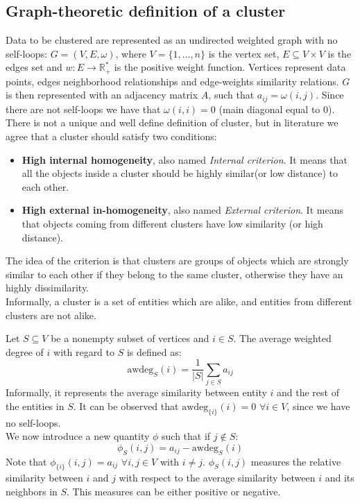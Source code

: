 \subsection{Graph-theoretic definition of a cluster}
Data to be clustered are represented as an undirected weighted graph with no self-loops: $G=(V, E, \omega)$, where $V=\{1,\dots,n\}$ is the vertex set, $E\subseteq V\times V$ is the edges set and $w: E\rightarrow \mathbb{R}^*_+$ is the positive weight function. Vertices represent data points, edges neighborhood relationships and edge-weights similarity relations. $G$ is then represented with an adjacency matrix $A$, such that $a_{ij} = \omega(i,j)$. Since there are not self-loops we have that $\omega(i,i) = 0$ (main diagonal equal to $0$).\\
There is not a unique and well define definition of cluster, but in literature we agree that a cluster should satisfy two conditions:
\begin{itemize}
  \item \textbf{High internal homogeneity}, also named \textit{Internal criterion}. It means that all the objects inside a cluster should be highly similar(or low distance) to each other.
  \item \textbf{High external in-homogeneity}, also named \textit{External criterion}. It means that objects coming from different clusters have low similarity (or high distance).
\end{itemize}
The idea of the criterion is that clusters are groups of objects which are strongly similar to each other if they belong to the same cluster, otherwise they have an highly dissimilarity.\\
Informally, a cluster is a set of entities which are alike, and entities from different clusters are not alike.

Let $S\subseteq V$ be a nonempty subset of vertices and $i \in S$. The average weighted degree of $i$ with regard to $S$ is defined as:\\
\begin{equation}
  \text{awdeg}_S(i)=\frac{1}{|S|}\sum_{j\in S}a_{ij}
\end{equation}
Informally, it represents the average similarity between entity $i$ and the rest of the entities in $S$.
It can be observed that $\text{awdeg}_{\{i\}}(i) = 0$  $\forall i \in V$, since we have no self-loops.\\
We now introduce a new quantity $\phi$ such that if $j \notin S$:
\begin{equation}
  \phi_S(i, j)=a_{ij}-\text{awdeg}_S(i)
\end{equation}
Note that $\phi_{\{i\}}(i, j)=a_{ij}$ $\forall i, j\in V$ with $i \neq j$. $\phi_S(i, j)$ measures the relative similarity between $i$ and $j$ with respect to the average similarity between $i$ and its neighbors in $S$. This measures can be either positive or negative.

